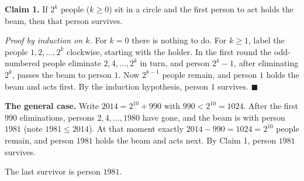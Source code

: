 \textbf{Claim 1.} If $2^k$ people ($k\ge0$) sit in a circle and the first person to act holds the beam, then that person survives.

\emph{Proof by induction on $k$.} For $k=0$ there is nothing to do. For $k\ge1$, label the people $1,2,\dots,2^k$ clockwise, starting with the holder. In the first round the odd-numbered people eliminate $2,4,\dots,2^k$ in turn, and person $2^k-1$, after eliminating $2^k$, passes the beam to person $1$. Now $2^{k-1}$ people remain, and person $1$ holds the beam and acts first. By the induction hypothesis, person $1$ survives. $\blacksquare$

\textbf{The general case.} Write $2014=2^{10}+990$ with $990<2^{10}=1024$. After the first $990$ eliminations, persons $2,4,\dots,1980$ have gone, and the beam is with person $1981$ (note $1981\le2014$). At that moment exactly $2014-990=1024=2^{10}$ people remain, and person $1981$ holds the beam and acts next. By Claim 1, person $1981$ survives.

The last survivor is person $\boxed{1981}$.
